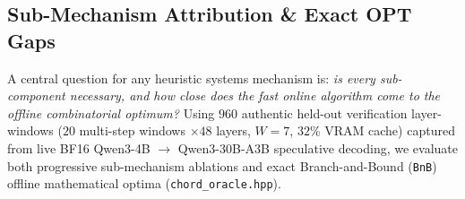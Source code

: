 \documentclass[10pt,twocolumn]{article}
\theoremstyle{definition}
\begin{document}
\subsection{Sub-Mechanism Attribution \& Exact \textsc{OPT} Gaps}
\label{sec:eval_oracle}

A central question for any heuristic systems mechanism is: \emph{is every sub-component necessary, and how close does the fast online algorithm come to the offline combinatorial optimum?} Using $960$ authentic held-out verification layer-windows ($20$ multi-step windows $\times 48$ layers, $W=7$, $32\%$ VRAM cache) captured from live BF16 Qwen3-4B $\to$ Qwen3-30B-A3B speculative decoding, we evaluate both progressive sub-mechanism ablations and exact Branch-and-Bound (\texttt{BnB}) offline mathematical optima (\texttt{chord\_oracle.hpp}).

\begin{table}[t]
  \centering
  \caption{Factor-by-factor router decomposition and offline exact Branch-and-Bound \textsc{OPT-SetCover} lower bound across $960$ real Qwen3-4B $\to$ Qwen3-30B-A3B layer-windows ($W=7$, $32\%$ VRAM). All $960/960$ \textsc{OPT} instances solved to proven optimality.}
  \label{tab:router_decomp}
  \footnotesize
  \setlength{\tabcolsep}{2.8pt}
\end{table}
\end{document}
